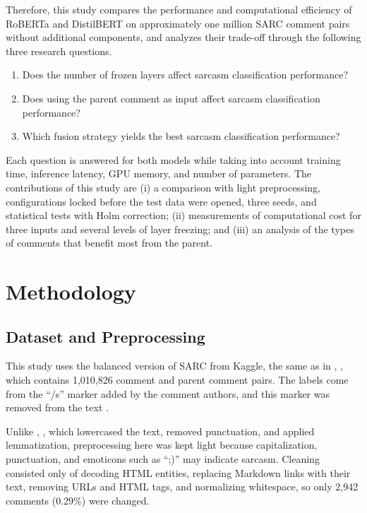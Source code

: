 \documentclass[conference]{IEEEtran}
\begin{document}
Therefore, this study compares the performance and computational efficiency of RoBERTa and DistilBERT on approximately one million SARC comment pairs without additional components, and analyzes their trade-off through the following three research questions.
\begin{enumerate}
\item Does the number of frozen layers affect sarcasm classification performance?
\item Does using the parent comment as input affect sarcasm classification performance?
\item Which fusion strategy yields the best sarcasm classification performance?
\end{enumerate}
Each question is answered for both models while taking into account training time, inference latency, GPU memory, and number of parameters. The contributions of this study are (i) a comparison with light preprocessing, configurations locked before the test data were opened, three seeds, and statistical tests with Holm correction; (ii) measurements of computational cost for three inputs and several levels of layer freezing; and (iii) an analysis of the types of comments that benefit most from the parent.

\section{Methodology}

\subsection{Dataset and Preprocessing}
\label{sec:data}
This study uses the balanced version of SARC \cite{khodak2018sarc} from Kaggle, the same as in \cite{dubey2026efficient}, \cite{zhang2025enhancing}, which contains 1,010,826 comment and parent comment pairs. The labels come from the ``/s'' marker added by the comment authors, and this marker was removed from the text \cite{khodak2018sarc}.

Unlike \cite{dubey2026efficient}, \cite{zhang2025enhancing}, which lowercased the text, removed punctuation, and applied lemmatization, preprocessing here was kept light because capitalization, punctuation, and emoticons such as ``;)'' may indicate sarcasm. Cleaning consisted only of decoding HTML entities, replacing Markdown links with their text, removing URLs and HTML tags, and normalizing whitespace, so only 2,942 comments (0.29\%) were changed.
\end{document}
